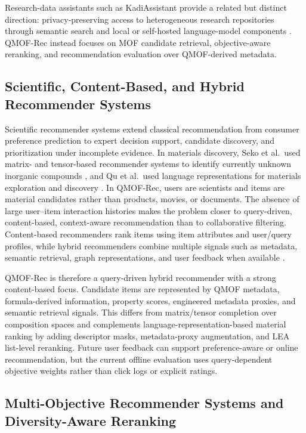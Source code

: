 \documentclass[12pt,a4paper]{article}
\begin{document}
Research-data assistants such as KadiAssistant provide a related but distinct direction: privacy-preserving access to heterogeneous research repositories through semantic search and local or self-hosted language-model components \cite{kadiassistant2026}. QMOF-Rec instead focuses on MOF candidate retrieval, objective-aware reranking, and recommendation evaluation over QMOF-derived metadata.

\subsection{Scientific, Content-Based, and Hybrid Recommender Systems}

Scientific recommender systems extend classical recommendation from consumer preference prediction to expert decision support, candidate discovery, and prioritization under incomplete evidence. In materials discovery, Seko et al.\ used matrix- and tensor-based recommender systems to identify currently unknown inorganic compounds \cite{seko2018}, and Qu et al.\ used language representations for materials exploration and discovery \cite{qu2023}. In QMOF-Rec, users are scientists and items are material candidates rather than products, movies, or documents. The absence of large user--item interaction histories makes the problem closer to query-driven, content-based, context-aware recommendation than to collaborative filtering. Content-based recommenders rank items using item attributes and user/query profiles, while hybrid recommenders combine multiple signals such as metadata, semantic retrieval, graph representations, and user feedback when available \cite{burke2002,lops2011,ricci2011}.

QMOF-Rec is therefore a query-driven hybrid recommender with a strong content-based focus. Candidate items are represented by QMOF metadata, formula-derived information, property scores, engineered metadata proxies, and semantic retrieval signals. This differs from matrix/tensor completion over composition spaces \cite{seko2018} and complements language-representation-based material ranking \cite{qu2023} by adding descriptor masks, metadata-proxy augmentation, and LEA list-level reranking. Future user feedback can support preference-aware or online recommendation, but the current offline evaluation uses query-dependent objective weights rather than click logs or explicit ratings.

\subsection{Multi-Objective Recommender Systems and Diversity-Aware Reranking}
\end{document}
